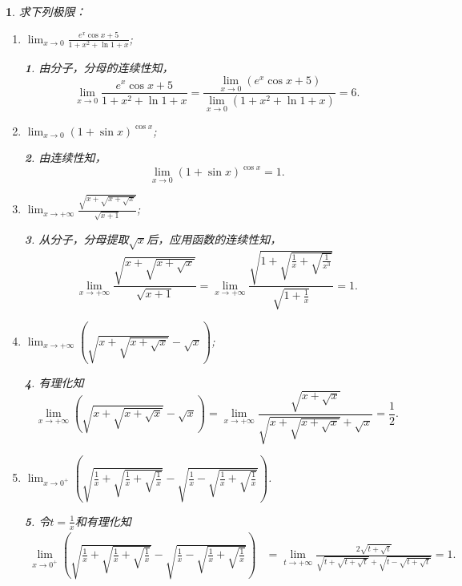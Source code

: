 \documentclass[utf8]{book}
\newtheorem{example}{}[section]             %
\newtheorem{solution}{}
\begin{document}
\begin{example}
求下列极限：
\renewcommand\labelenumi{\normalfont(\theenumi)}
\begin{enumerate}
\item $\displaystyle\lim_{x\to 0}\frac{e^x\cos{x}+5}{1+x^2+\ln{1+x}}$;
\begin{solution}由分子，分母的连续性知，$$\displaystyle\lim_{x\to 0}\frac{e^x\cos{x}+5}{1+x^2+\ln{1+x}}=\frac{\displaystyle\lim_{x\to 0}(e^x\cos{x}+5)}{\displaystyle\lim_{x\to 0}(1+x^2+\ln{1+x})}=6.$$
\end{solution}
\item $\displaystyle\lim_{x\to 0}(1+\sin{x})^{\cos{x}}$;
\begin{solution}由连续性知，$$\displaystyle\lim_{x\to 0}(1+\sin{x})^{\cos{x}}=1.$$
\end{solution}
\item $\displaystyle\lim_{x\to +\infty}\frac{\sqrt{x+\sqrt{x+\sqrt{x}}}}{\sqrt{x+1}}$;
\begin{solution}从分子，分母提取$\sqrt{x}$后，应用函数的连续性知，
$$\displaystyle\lim_{x\to +\infty}\frac{\sqrt{x+\sqrt{x+\sqrt{x}}}}{\sqrt{x+1}}=\displaystyle\lim_{x\to +\infty}\frac{\sqrt{1+\sqrt{\frac{1}{x}+\sqrt{\frac{1}{x^3}}}}}{\sqrt{1+\frac{1}{x}}}=1.$$
\end{solution}
\item $\displaystyle\lim_{x\to +\infty}\left(\sqrt{x+\sqrt{x+\sqrt{x}}}-\sqrt{x}\right)$;
\begin{solution}有理化知
$$\displaystyle\lim_{x\to +\infty}\left(\sqrt{x+\sqrt{x+\sqrt{x}}}-\sqrt{x}\right)=\displaystyle\lim_{x\to +\infty}\frac{\sqrt{x+\sqrt{x}}}{\sqrt{x+\sqrt{x+\sqrt{x}}}+\sqrt{x}}=\frac{1}{2}.$$
\end{solution}
\item $\displaystyle\lim_{x\to 0^+}\left(\sqrt{\frac{1}{x}+\sqrt{\frac{1}{x}+\sqrt{\frac{1}{x}}}}-\sqrt{\frac{1}{x}-\sqrt{\frac{1}{x}+\sqrt{\frac{1}{x}}}}\right)$.
\begin{solution}令$t=\frac{1}{x}$和有理化知
\begin{equation*}
\begin{split}
\displaystyle\lim_{x\to 0^+}\left(\sqrt{\frac{1}{x}+\sqrt{\frac{1}{x}+\sqrt{\frac{1}{x}}}}-\sqrt{\frac{1}{x}-\sqrt{\frac{1}{x}+\sqrt{\frac{1}{x}}}}\right)&=\displaystyle\lim_{t\to +\infty}\frac{2\sqrt{t+\sqrt{t}}}{\sqrt{t+\sqrt{t+\sqrt{t}}}+\sqrt{t-\sqrt{t+\sqrt{t}}}}=1.
\end{split}
\end{equation*}
\end{solution}
\end{enumerate}
\end{example}
\end{document}
